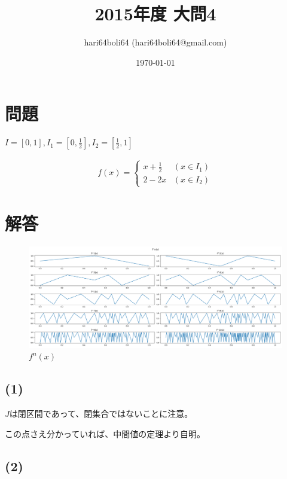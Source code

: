 \documentclass[a4paper, 10pt, dvipdfmx]{jlreq}
\begin{document}
\title{2015年度 大問4}
\author{hari64boli64 (hari64boli64@gmail.com)}
\date{\today}
\maketitle

\section{問題}

$I=[0,1],I_1=[0,\frac{1}{2}],I_2=[\frac{1}{2},1]$

\begin{align*}
  f(x)=\begin{cases}
    x+\frac{1}{2} & (x\in I_1)  \\
    2-2x          & (x \in I_2)
  \end{cases}
\end{align*}

\section{解答}

\begin{figure}[htbp]
  \begin{center}
    \includegraphics[width=140mm]{4.png}
    \caption{$f^n(x)$}
    \label{img:fnx}
  \end{center}
\end{figure}

\subsection*{(1)}

$J$は閉区間であって、閉集合ではないことに注意。

この点さえ分かっていれば、中間値の定理より自明。

\subsection*{(2)}
\end{document}
